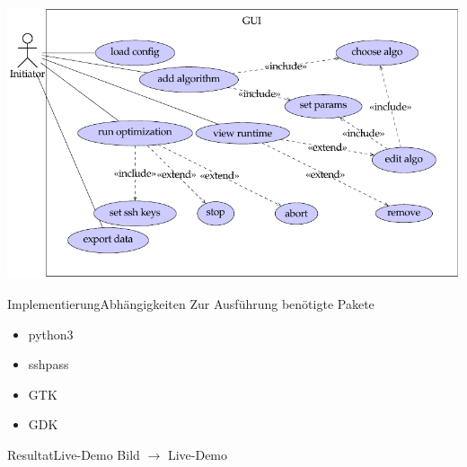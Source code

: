 \documentclass[ngerman,10pt,xcolor=colortbl,compress
]{beamer}
\begin{document}
	\begin{frame}
	\includegraphics[scale=0.5]{GUI-use-case.png} 
	\end{frame}
	
	\begin{frame}{Implementierung}{Abhängigkeiten}
		Zur Ausführung benötigte Pakete
		\begin{itemize}
			\item python3
			\item sshpass
			\item GTK
			\item GDK
		\end{itemize}
	\end{frame}
	
	\begin{frame}{Resultat}{Live-Demo}
	Bild $\rightarrow$ Live-Demo
	\end{frame}

	
\end{document}

